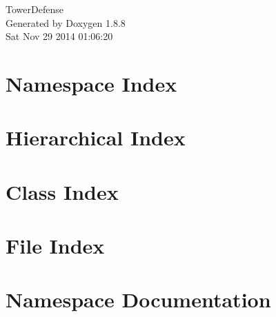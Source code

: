 \documentclass[twoside]{book}
\newcommand{\+}{\discretionary{\mbox{\scriptsize$\hookleftarrow$}}{}{}}
\newcommand{\clearemptydoublepage}{%
  \newpage{\pagestyle{empty}\cleardoublepage}%
}
\begin{document}
\hypersetup{pageanchor=false,
             bookmarks=true,
             bookmarksnumbered=true,
             pdfencoding=unicode
            }
\begin{titlepage}
\vspace*{7cm}
\begin{center}%
{\Large Tower\+Defense }\\
\vspace*{1cm}
{\large Generated by Doxygen 1.8.8}\\
\vspace*{0.5cm}
{\small Sat Nov 29 2014 01:06:20}\\
\end{center}
\end{titlepage}
\clearemptydoublepage
\tableofcontents
\clearemptydoublepage
{}
\hypersetup{pageanchor=true}

\chapter{Namespace Index}

\chapter{Hierarchical Index}

\chapter{Class Index}

\chapter{File Index}

\chapter{Namespace Documentation}

\end{document}
